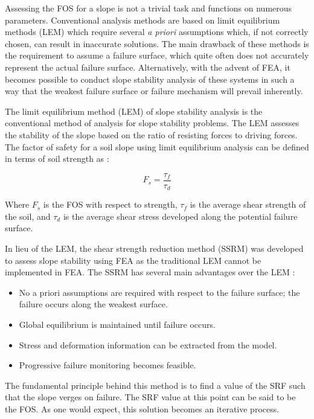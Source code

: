 Assessing the FOS for a slope is not a trivial task and functions on numerous parameters. Conventional analysis methods are based on limit equilibrium methods (LEM) which require several \textit{a priori} assumptions which, if not correctly chosen, can result in inaccurate solutions. The main drawback of these methods is the requirement to assume a failure surface, which quite often does not accurately represent the actual failure surface. Alternatively, with the advent of FEA, it becomes possible to conduct slope stability analysis of these systems in such a way that the weakest failure surface or failure mechanism will prevail inherently.

The limit equilibrium method (LEM) of slope stability analysis is the conventional method of analysis for slope stability problems. The LEM assesses the stability of the slope based on the ratio of resisting forces to driving forces. The factor of safety for a soil slope using limit equilibrium analysis can be defined in terms of soil strength as \citep{das_principles_2009}: 

\begin{equation}
F_s=\frac{\tau_f}{\tau_d}
\label{eqn:limeq}
\end{equation}

Where $F_s$ is the FOS with respect to strength, $\tau_f$ is the average shear strength of the soil, and $\tau_d$ is the average shear stress developed along the potential failure surface. 

In lieu of the LEM, the shear strength reduction method (SSRM) was developed to assess slope stability using FEA as the traditional LEM cannot be implemented in FEA. The SSRM has several main advantages over the LEM \citep{griffiths_slope_1999}:

\begin{itemize}
\item No a priori assumptions are required with respect to the failure surface; the failure occurs along the weakest surface.
\item Global equilibrium is maintained until failure occurs.
\item Stress and deformation information can be extracted from the model.
\item Progressive failure monitoring becomes feasible.
\end{itemize}

The fundamental principle behind this method is to find a value of the SRF such that the slope verges on failure. The SRF value at this point can be said to be the FOS. As one would expect, this solution becomes an iterative process. 
